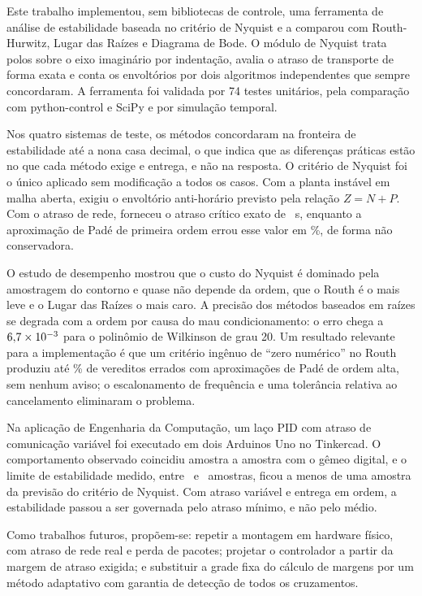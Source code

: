 Este trabalho implementou, sem bibliotecas de controle, uma ferramenta de análise de estabilidade baseada no critério de Nyquist e a comparou com Routh-Hurwitz, Lugar das Raízes e Diagrama de Bode. O módulo de Nyquist trata polos sobre o eixo imaginário por indentação, avalia o atraso de transporte de forma exata e conta os envoltórios por dois algoritmos independentes que sempre concordaram. A ferramenta foi validada por 74 testes unitários, pela comparação com python-control e SciPy e por simulação temporal.

Nos quatro sistemas de teste, os métodos concordaram na fronteira de estabilidade até a nona casa decimal, o que indica que as diferenças práticas estão no que cada método exige e entrega, e não na resposta. O critério de Nyquist foi o único aplicado sem modificação a todos os casos. Com a planta instável em malha aberta, exigiu o envoltório anti-horário previsto pela relação $Z=N+P$. Com o atraso de rede, forneceu o atraso crítico exato de \TauCrit~s, enquanto a aproximação de Padé de primeira ordem errou esse valor em \ErroPadeApct\%, de forma não conservadora.

O estudo de desempenho mostrou que o custo do Nyquist é dominado pela amostragem do contorno e quase não depende da ordem, que o Routh é o mais leve e o Lugar das Raízes o mais caro. A precisão dos métodos baseados em raízes se degrada com a ordem por causa do mau condicionamento: o erro chega a $6{,}7\times 10^{-3}$ para o polinômio de Wilkinson de grau 20. Um resultado relevante para a implementação é que um critério ingênuo de ``zero numérico'' no Routh produziu até \RobAbsErro\% de vereditos errados com aproximações de Padé de ordem alta, sem nenhum aviso; o escalonamento de frequência e uma tolerância relativa ao cancelamento eliminaram o problema.

Na aplicação de Engenharia da Computação, um laço PID com atraso de comunicação variável foi executado em dois Arduinos Uno no Tinkercad. O comportamento observado coincidiu amostra a amostra com o gêmeo digital, e o limite de estabilidade medido, entre \TkQuatroaD\ e \TkQuatrobD\ amostras, ficou a menos de uma amostra da previsão do critério de Nyquist. Com atraso variável e entrega em ordem, a estabilidade passou a ser governada pelo atraso mínimo, e não pelo médio.

Como trabalhos futuros, propõem-se: repetir a montagem em hardware físico, com atraso de rede real e perda de pacotes; projetar o controlador a partir da margem de atraso exigida; e substituir a grade fixa do cálculo de margens por um método adaptativo com garantia de detecção de todos os cruzamentos.

